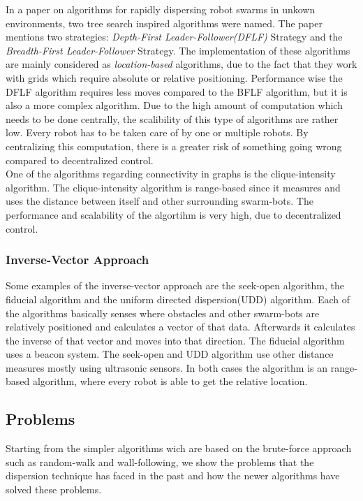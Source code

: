 In a paper on algorithms for rapidly dispersing robot swarms in unkown environments\cite{hsiang2004algorithms}, two tree search inspired algorithms were named.
The paper mentions two strategies: \emph{Depth-First Leader-Follower(DFLF)} Strategy and the \emph{Breadth-First Leader-Follower} Strategy.
The implementation of these algorithms are mainly considered as \emph{location-based} algorithms, due to the fact that they work with grids which require absolute or relative positioning.
Performance wise the DFLF algorithm requires less moves compared to the BFLF algorithm, but it is also a more complex algorithm.
Due to the high amount of computation which needs to be done centrally, the scalibility of this type of algorithms are rather low.
Every robot has to be taken care of by one or multiple robots. By centralizing this computation, there is a greater risk of something going wrong compared to decentralized control.\\

One of the algorithms regarding connectivity in graphs is the clique-intensity algorithm.\cite{ugur2007dispersion}
The clique-intensity algorithm is range-based since it measures and uses the distance between itself and other surrounding swarm-bots.
The performance and scalability of the algortihm is very high, due to decentralized control.

\subsubsection{Inverse-Vector Approach}
Some examples of the inverse-vector approach are the seek-open algorithm\cite{morlok2007dispersing}, the fiducial algorithm\cite{morlok2007dispersing} and the uniform directed dispersion(UDD) algorithm\cite{mclurkin2007distributed}.
Each of the algorithms basically senses where obstacles and other swarm-bots are relatively positioned and calculates a vector of that data. Afterwards it calculates the inverse of that vector and moves into that direction.
The fiducial algorithm uses a beacon system. The seek-open and UDD algorithm use other distance measures mostly using ultrasonic sensors. In both cases the algorithm is an range-based algorithm, where every robot is able to get the relative location. 
  \subsection{Problems}
Starting from the simpler algorithms wich are based on the brute-force approach such as random-walk and wall-following, we show the problems that the dispersion technique has faced in the past and how the newer algorithms have solved these problems.

